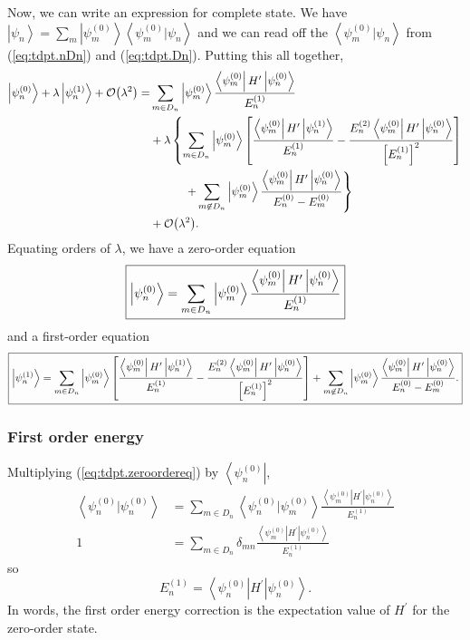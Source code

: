 \documentclass[11pt]{article}
\newcommand{\Od}[1]{\mathcal{O}{\left(#1\right)}}
\newcommand{\bra}[1]{\left\langle#1\right|}
\newcommand{\ket}[1]{\left|#1\right\rangle}
\newcommand{\braket}[2]{\left\langle#1|#2\right\rangle}
\theoremstyle{theorem}
\theoremstyle{remark}
\theoremstyle{step}
\theoremstyle{gap}
\begin{document}
Now, we can write an expression for complete state. We have \(\ket{\psi_n} = \sum_m \ket{\psi_m^{(0)}} \braket{\psi_m^{(0)}}{\psi_n}\) and we can read off the \(\braket{\psi_m^{(0)}}{\psi_n}\) from (\ref{eq:tdpt.nDn}) and (\ref{eq:tdpt.Dn}). Putting this all together,
\begin{align}
\ksnp{n}{0} + \lambda \ksnp{n}{1} + \Od{\lambda^2} =
&\sum_{m \in D_n}\ket{\psi_m^{(0)}}\frac{\bra{\psi_m^{(0)}} H^\prime \ket{\psi_n^{(0)}}}{E_n^{(1)}}
\\\nonumber&+\lambda \left\{
\sum_{m \in D_n}\ket{\psi_m^{(0)}} \left[\frac{\bra{\psi_m^{(0)}} H^\prime \ket{\psi_n^{(1)}}}{E_n^{(1)}} - \frac{E_n^{(2)} \bra{\psi_m^{(0)}} H^\prime \ket{\psi_n^{(0)}}}{{\left[E_n^{(1)}\right]}^2}\right]\right.
\\\nonumber&\hspace{3em}\left.+ \sum_{m \not\in D_n} \ket{\psi_m^{(0)}}\frac{\bra{\psi_m^{(0)}} H^\prime \ksnp{n}{0}}{E_n^{(0)} - E_m^{(0)}}\right\}
\\\nonumber&+\Od{\lambda^2}. 
\end{align}
Equating orders of \(\lambda\), we have a zero-order equation
\begin{equation}\label{eq:tdpt.zeroordereq}
\boxed{\ksnp{n}{0} = \sum_{m \in D_n}\ket{\psi_m^{(0)}}\frac{\bra{\psi_m^{(0)}} H^\prime \ket{\psi_n^{(0)}}}{E_n^{(1)}}}
\end{equation}
and a first-order equation
\begin{equation}\label{eq:tdpt.firstordereq}
\boxed{\ksnp{n}{1} = \sum_{m \in D_n}\ket{\psi_m^{(0)}}
\left[\frac{\bra{\psi_m^{(0)}} H^\prime \ket{\psi_n^{(1)}}}{E_n^{(1)}} - 
\frac{E_n^{(2)} \bra{\psi_m^{(0)}} H^\prime \ket{\psi_n^{(0)}}}{{\left[E_n^{(1)}\right]}^2}\right]
+ \sum_{m \not\in D_n} \ket{\psi_m^{(0)}}\frac{\bra{\psi_m^{(0)}} H^\prime \ksnp{n}{0}}{E_n^{(0)} - E_m^{(0)}}.}
\end{equation}

\subsubsection{First order energy}

Multiplying (\ref{eq:tdpt.zeroordereq}) by \(\bra{\psi_n^{(0)}}\),
\begin{align*}
\braket{\psi_n^{(0)}}{\psi_n^{(0)}} &= \sum_{m \in D_n}\braket{\psi_n^{(0)}}{\psi_m^{(0)}}\frac{\bra{\psi_m^{(0)}} H^\prime \ket{\psi_n^{(0)}}}{E_n^{(1)}} \\
1 &= \sum_{m \in D_n}\delta_{mn}\frac{\bra{\psi_m^{(0)}} H^\prime \ket{\psi_n^{(0)}}}{E_n^{(1)}}
\end{align*}
so
\[
\boxed{E_n^{(1)} = \bra{\psi_n^{(0)}} H^\prime \ket{\psi_n^{(0)}}}.
\]
In words, the first order energy correction is the expectation value of \(H^\prime\) for the zero-order state.
\end{document}
